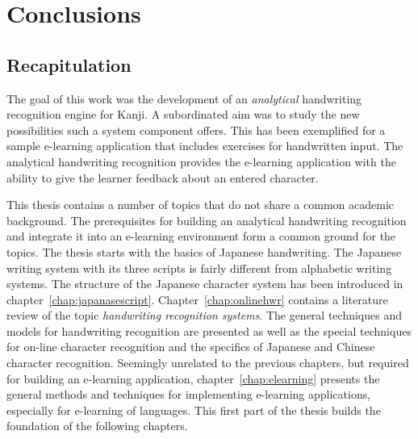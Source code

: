 \chapter{Conclusions}
\label{chap:conclusions}





\section{Recapitulation}
\label{sec:conclusion:recapitulation}

The goal of this work was the development of an \emph{analytical} handwriting
recognition engine for Kanji. A subordinated aim was to study the new 
possibilities such a system component offers. This has been exemplified for
a sample e-learning application that includes exercises for handwritten input.
The analytical handwriting recognition provides the e-learning 
application with the ability to give the learner feedback about an 
entered character.

This thesis contains a number of topics that do not share a common academic 
background. The prerequisites for building an analytical handwriting recognition
and integrate it into an e-learning environment form a common ground for the 
topics. The thesis starts with the basics of Japanese handwriting. The Japanese
writing system with its three scripts is fairly different from alphabetic 
writing systems. The structure of the Japanese character system has been 
introduced in chapter~\ref{chap:japanasescript}.
Chapter~\ref{chap:onlinehwr} contains a literature review of the topic 
\emph{handwriting recognition systems}. The general techniques and models
for handwriting recognition are presented as well as the special techniques
for on-line character recognition and the specifics of Japanese and Chinese 
character recognition.
Seemingly unrelated to the previous chapters, but required for building an
e-learning application, chapter~\ref{chap:elearning} presents the general
methods and techniques for implementing e-learning applications, especially 
for e-learning of languages. This first part of the thesis builds the 
foundation of the following chapters.

